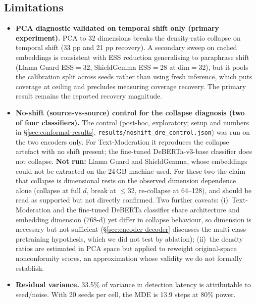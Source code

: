 \documentclass{article}
\begin{document}
\subsection{Limitations}
\label{sec:limitations}

\begin{itemize}
\item \textbf{PCA diagnostic validated on temporal shift only (primary experiment).} PCA to 32 dimensions breaks the density-ratio collapse on temporal shift (33 pp and 21 pp recovery). A secondary sweep on cached embeddings is consistent with ESS reduction generalising to paraphrase shift (Llama Guard ESS$=$32, ShieldGemma ESS$=$28 at dim$=$32), but it pools the calibration split across seeds rather than using fresh inference, which puts coverage at ceiling and precludes measuring coverage recovery. The primary result remains the reported recovery magnitude.
\item \textbf{No-shift (source-vs-source) control for the collapse diagnosis (two of four classifiers).} The control (post-hoc, exploratory; setup and numbers in \S\ref{sec:conformal-results}, \texttt{results/noshift\_dre\_control.json}) was run on the two encoders only. For Text-Moderation it reproduces the collapse artefact with no shift present; the fine-tuned DeBERTa-v3-base classifier does not collapse. \textbf{Not run:} Llama Guard and ShieldGemma, whose embeddings could not be extracted on the 24\,GB machine used. For these two the claim that collapse is dimensional rests on the observed dimension dependence alone (collapse at full $d$, break at ${\leq}32$, re-collapse at 64--128), and should be read as supported but not directly confirmed. Two further caveats: (i)~Text-Moderation and the fine-tuned DeBERTa classifier share architecture and embedding dimension (768-d) yet differ in collapse behaviour, so dimension is necessary but not sufficient (\S\ref{sec:encoder-decoder} discusses the multi-class-pretraining hypothesis, which we did not test by ablation); (ii)~the density ratios are estimated in PCA space but applied to reweight original-space nonconformity scores, an approximation whose validity we do not formally establish.
\item \textbf{Residual variance.} 33.5\% of variance in detection latency is attributable to seed/noise. With 20 seeds per cell, the MDE is 13.9 steps at 80\% power.

\end{itemize}
\end{document}
